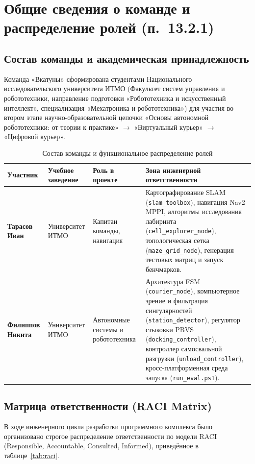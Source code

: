 \documentclass[a4paper,11pt]{article}
\begin{document}
\tableofcontents
\newpage

\section{Общие сведения о команде и распределение ролей (п.~13.2.1)}

\subsection{Состав команды и академическая принадлежность}
Команда «Вкатуны» сформирована студентами Национального исследовательского университета ИТМО (Факультет систем управления и робототехники, направление подготовки «Робототехника и искусственный интеллект», специализация «Мехатроника и робототехника») для участия во втором этапе научно-образовательной цепочки «Основы автономной робототехники: от теории к практике» $\to$ «Виртуальный курьер» $\to$ «Цифровой курьер».

\begin{table}[htbp]
\centering
\small
\begin{tabularx}{\textwidth}{p{3.2cm}p{3.0cm}p{3.8cm}X}
\toprule
\textbf{Участник} & \textbf{Учебное заведение} & \textbf{Роль в проекте} & \textbf{Зона инженерной ответственности} \\
\midrule
\textbf{Тарасов Иван} & Университет ИТМО & Капитан команды, навигация & Картографирование SLAM (\texttt{slam\_toolbox}), навигация Nav2 MPPI, алгоритмы исследования лабиринта (\texttt{cell\_explorer\_node}), топологическая сетка (\texttt{maze\_grid\_node}), генерация тестовых матриц и запуск бенчмарков. \\
\midrule
\textbf{Филиппов Никита} & Университет ИТМО & Автономные системы и робототехника & Архитектура FSM (\texttt{courier\_node}), компьютерное зрение и фильтрация сингулярностей (\texttt{station\_detector}), регулятор стыковки PBVS (\texttt{docking\_controller}), контроллер самосвальной разгрузки (\texttt{unload\_controller}), кросс-платформенная среда запуска (\texttt{run\_eval.ps1}). \\
\bottomrule
\end{tabularx}
\caption{Состав команды и функциональное распределение ролей}
\label{tab:team_roles}
\end{table}

\subsection{Матрица ответственности (RACI Matrix)}
В ходе инженерного цикла разработки программного комплекса было организовано строгое распределение ответственности по модели RACI (Responsible, Accountable, Consulted, Informed), приведённое в таблице~\ref{tab:raci}.
\end{document}
